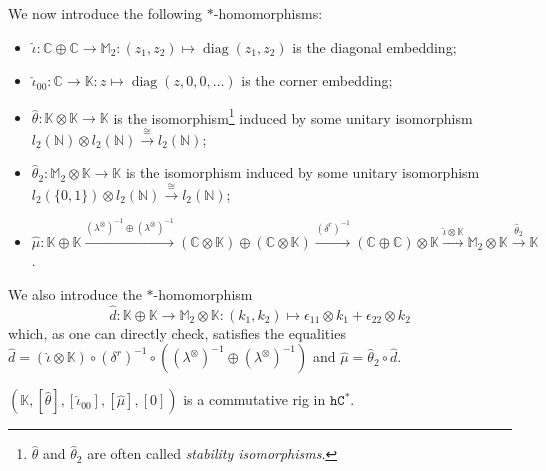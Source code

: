 \documentclass[10pt]{simplearticle}
\newcommand{\diag}{\operatorname*{diag}}
\newcommand{\hCstar}{\mathtt{hC^{*}}}
\newcommand{\oK}{\mathbb{K}}
\newcommand{\oM}{\mathbb{M}}
\begin{document}
We now introduce the following $*$-homomorphisms:
\begin{itemize}
\item $\widehat{\iota}\colon\mathbb{C}\oplus\mathbb{C}\to\oM_{2}\colon(z_{1},z_{2})\mapsto\diag(z_{1},z_{2})$
is the diagonal embedding;
\item $\widehat{\iota}_{00}\colon\mathbb{C}\to\oK\colon z\mapsto\diag(z,0,0,\dots)$
is the corner embedding;
\item $\widehat{\theta}\colon\oK\otimes\oK\to\oK$ is the isomorphism\footnote{$\widehat{\theta}$ and $\widehat{\theta}_{2}$ are often called \emph{stability
isomorphisms}.} induced by some unitary isomorphism $l_{2}(\mathbb{N})\otimes l_{2}(\mathbb{N})\xrightarrow{\cong}l_{2}(\mathbb{N})$;
\item $\widehat{\theta}_{2}\colon\oM_{2}\otimes\oK\to\oK$ is the isomorphism
induced by some unitary isomorphism $l_{2}(\{0,1\})\otimes l_{2}(\mathbb{N})\xrightarrow{\cong}l_{2}(\mathbb{N})$;
\item $\widehat{\mu}\colon\oK\oplus\oK\xrightarrow{(\lambda^{\otimes})^{-1}\oplus(\lambda^{\otimes})^{-1}}(\mathbb{C}\otimes\oK)\oplus(\mathbb{C}\otimes\oK)\xrightarrow{(\delta^{r})^{-1}}(\mathbb{C}\oplus\mathbb{C})\otimes\oK\xrightarrow{\widehat{\iota}\otimes\oK}\oM_{2}\otimes\oK\xrightarrow{\widehat{\theta}_{2}}\oK$.
\end{itemize}
We also introduce the $*$-homomorphism
\[
\widehat{d}\colon\oK\oplus\oK\to\oM_{2}\otimes\oK\colon(k_{1},k_{2})\mapsto\epsilon_{11}\otimes k_{1}+\epsilon_{22}\otimes k_{2}
\]
which, as one can directly check, satisfies the equalities $\widehat{d}=(\widehat{\iota}\otimes\oK)\circ(\delta^{r})^{-1}\circ((\lambda^{\otimes})^{-1}\oplus(\lambda^{\otimes})^{-1})$
and $\widehat{\mu}=\widehat{\theta}_{2}\circ\widehat{d}$.
\begin{prop}\label{prop:rig-K-1}
 $(\oK,[\widehat{\theta}],[\widehat{\iota}_{00}],[\widehat{\mu}],[0])$
is a commutative
rig in $\hCstar$.
\end{prop}
\end{document}
